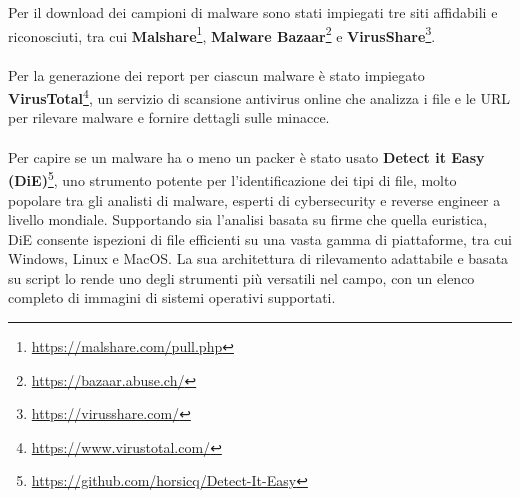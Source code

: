 \\\\
Per il download dei campioni di malware sono stati impiegati tre siti affidabili e riconosciuti, tra cui \textbf{Malshare}\footnote{\url{https://malshare.com/pull.php}}, \textbf{Malware Bazaar}\footnote{\url{https://bazaar.abuse.ch/}} e \textbf{VirusShare}\footnote{\url{https://virusshare.com/}}.
\\\\
Per la generazione dei report per ciascun malware è stato impiegato \textbf{VirusTotal}\footnote{\url{https://www.virustotal.com/}}, un servizio di scansione antivirus online che analizza i file e le URL per rilevare malware e fornire dettagli sulle minacce.
\\\\
Per capire se un malware ha o meno un packer è stato usato \textbf{Detect it Easy (DiE)}\footnote{\url{https://github.com/horsicq/Detect-It-Easy}}, uno strumento potente per l'identificazione dei tipi di file, molto popolare tra gli analisti di malware, esperti di cybersecurity e reverse engineer a livello mondiale. Supportando sia l'analisi basata su firme che quella euristica, DiE consente ispezioni di file efficienti su una vasta gamma di piattaforme, tra cui Windows, Linux e MacOS. La sua architettura di rilevamento adattabile e basata su script lo rende uno degli strumenti più versatili nel campo, con un elenco completo di immagini di sistemi operativi supportati.


